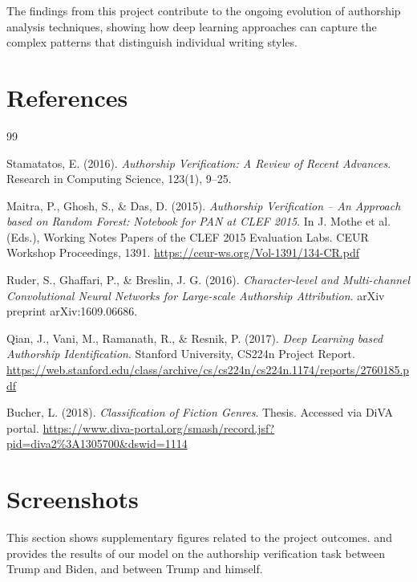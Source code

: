 \documentclass[12pt,a4paper]{article}
\begin{document}
The findings from this project contribute to the ongoing evolution of authorship analysis techniques, showing how deep learning approaches can capture the complex patterns that distinguish individual writing styles.

\section{References}
\begin{thebibliography}{99} %

Stamatatos, E. (2016).
\textit{Authorship Verification: A Review of Recent Advances}.
Research in Computing Science, 123(1), 9--25.

Maitra, P., Ghosh, S., \& Das, D. (2015).
\textit{Authorship Verification -- An Approach based on Random Forest: Notebook for PAN at CLEF 2015}.
In J. Mothe et al. (Eds.), Working Notes Papers of the CLEF 2015 Evaluation Labs.
CEUR Workshop Proceedings, 1391.
\url{https://ceur-ws.org/Vol-1391/134-CR.pdf}

Ruder, S., Ghaffari, P., \& Breslin, J. G. (2016).
\textit{Character-level and Multi-channel Convolutional Neural Networks for Large-scale Authorship Attribution}.
arXiv preprint arXiv:1609.06686.

Qian, J., Vani, M., Ramanath, R., \& Resnik, P. (2017). %
\textit{Deep Learning based Authorship Identification}.
Stanford University, CS224n Project Report.
\url{https://web.stanford.edu/class/archive/cs/cs224n/cs224n.1174/reports/2760185.pdf}

Bucher, L. (2018). %
\textit{Classification of Fiction Genres}.
Thesis. Accessed via DiVA portal.
\url{https://www.diva-portal.org/smash/record.jsf?pid=diva2%3A1305700&dswid=1114}

\end{thebibliography}

\section{Screenshots}
This section shows supplementary figures related to the project outcomes.  and  provides the results of our model on the authorship verification task between Trump and Biden, and between Trump and himself.
\end{document}
